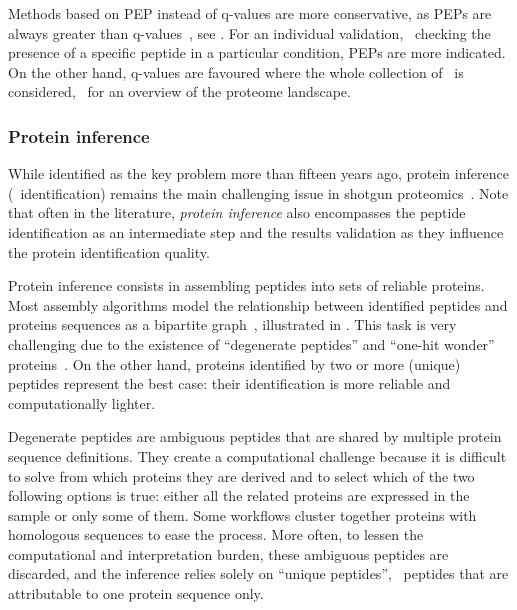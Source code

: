 Methods based on \gls{PEP} instead of q-values are more conservative,
as \glspl{PEP} are always greater than q-values~,
see .
For an individual validation,
\eg\ checking the presence of a specific peptide in a particular condition,
\glspl{PEP} are more indicated.
On the other hand, q-values are favoured
where the whole collection of \psms\ is considered,
\eg\ for an overview of the proteome landscape.~

\subsubsection{Protein inference}\label{subsec:proteinInference}

While identified as the key problem more than fifteen years ago,
protein inference (\ie\ identification) remains
the main challenging issue in shotgun proteomics~.
Note that often in the literature,
\emph{protein inference} also encompasses
the peptide identification as an intermediate step
and the results validation
as they influence the protein identification quality.

Protein inference consists
in assembling peptides into sets of reliable proteins.
Most assembly algorithms model
the relationship between identified peptides and proteins sequences
as a bipartite graph~, illustrated in .
This task is very challenging due to
the existence of \enquote{degenerate peptides} and
\enquote{one-hit wonder} proteins~.
On the other hand,
proteins identified by two or more (unique) peptides represent the best case:
their identification is more reliable and computationally lighter.

Degenerate peptides are ambiguous peptides
that are shared by multiple protein sequence definitions.
They create a computational challenge
because it is difficult
to solve from which proteins they are derived
and to select which of the two following options is true:
either all the related proteins are expressed in the sample
or only some of them.
Some workflows cluster together proteins with homologous sequences
to ease the process.
More often, to lessen the computational and interpretation burden,
these ambiguous peptides are discarded, and
the inference relies solely on \enquote{unique peptides},
\ie\ peptides that are attributable to one protein sequence only.

